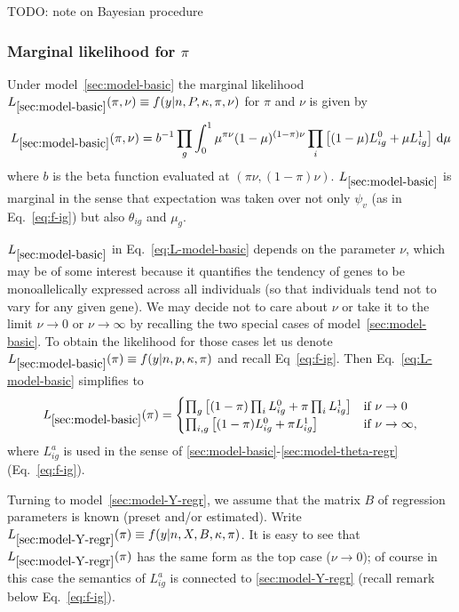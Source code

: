 \documentclass[letterpaper]{article}
\begin{document}
TODO: note on Bayesian procedure

\subsubsection{Marginal likelihood for \(\pi\)}

Under model~\ref{sec:model-basic} the marginal likelihood
\(L_{\ref{sec:model-basic}}(\pi,\nu)\equiv
f(y|n,P,\kappa,\pi,\nu)\) for \(\pi\) and \(\nu\) is given by
\begin{equation}
\label{eq:L-model-basic}
L_{\ref{sec:model-basic}}(\pi,\nu) = b^{-1} \prod_{g} \int_{0}^{1} \mu^{\pi\nu} (1-\mu)^{(1-\pi)\nu}
\prod_{i}
\left[
(1-\mu) L_{ig}^0 + \mu L_{ig}^1
\right]
\, \mathrm{d}\mu
\end{equation}
where \(b\) is the beta function evaluated at \((\pi\nu, (1-\pi)\nu)\).
\(L_{\ref{sec:model-basic}}\) is marginal in the sense that expectation was taken over not only
\(\psi_v\) (as in Eq.~\ref{eq:f-ig}) but also \(\theta_{ig}\) and \(\mu_g\).

\(L_{\ref{sec:model-basic}}\) in Eq.~\ref{eq:L-model-basic} depends on the parameter \(\nu\), which
may be of some interest because it quantifies the tendency of genes to be
monoallelically expressed across all individuals (so that individuals tend not
to vary for any given gene).  We may decide not to care about \(\nu\) or take
it to the limit \(\nu\rightarrow 0\) or \(\nu\rightarrow \infty\) by recalling
the two special cases of model~\ref{sec:model-basic}.  To obtain the
likelihood for those cases let us denote \(L_{\ref{sec:model-basic}}(\pi)\equiv
f(y|n,p,\kappa,\pi)\) and recall Eq~\ref{eq:f-ig}.  Then
Eq.~\ref{eq:L-model-basic} simplifies to
\begin{equation}
\label{eq:L-model-basics-special}
L_{\ref{sec:model-basic}}(\pi) =
\begin{cases}
\prod_{g}
\left[
(1-\pi) \prod_i L_{ig}^0 + \pi \prod_i L_{ig}^1
\right]
& \text{if } \nu\rightarrow 0
\\
\prod_{i,g}
\left[
(1-\pi) L_{ig}^0 + \pi L_{ig}^1
\right]
& \text{if } \nu\rightarrow\infty,
\end{cases}
\end{equation}
where \(L_{ig}^a\) is used in the sense of
\ref{sec:model-basic}-\ref{sec:model-theta-regr} (Eq.~\ref{eq:f-ig}).

Turning to model~\ref{sec:model-Y-regr}, we assume that the matrix \(B\) of regression
parameters is known
(preset and/or estimated).  Write \(L_{\ref{sec:model-Y-regr}}(\pi)\equiv
f(y|n,X,B,\kappa,\pi)\).  It is easy to see that
\(L_{\ref{sec:model-Y-regr}}(\pi)\) has the same form as the top case
(\(\nu\rightarrow 0\)); of course in this case the semantics of \(L_{ig}^a\)
is connected to \ref{sec:model-Y-regr} (recall remark below Eq.~\ref{eq:f-ig}).
\end{document}
